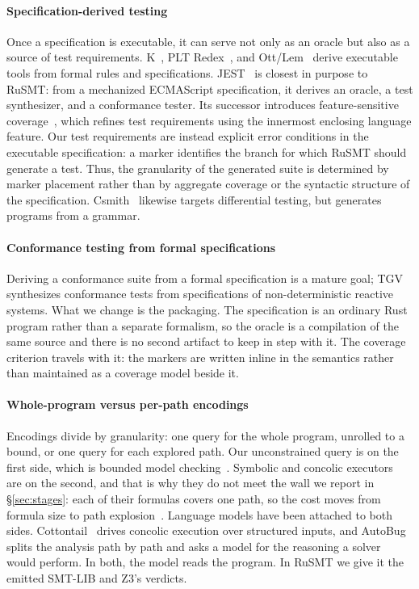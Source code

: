 \documentclass[sigconf,screen]{acmart}
\theoremstyle{definition}
\theoremstyle{remark}
\newcommand{\rusmt}{RuSMT}
\begin{document}
\paragraph{Specification-derived testing}
Once a specification is executable, it can serve not only as an oracle but also as a source of test requirements. K~\cite{rosu2010k}, PLT Redex~\cite{felleisen2009redex}, and Ott/Lem~\cite{sewell2007ott,mulligan2014lem} derive executable tools from formal rules and specifications. JEST~\cite{park2021jest} is closest in purpose to \rusmt{}: from a mechanized ECMAScript specification, it derives an oracle, a test synthesizer, and a conformance tester. Its successor introduces feature-sensitive coverage~\cite{park2023fscoverage}, which refines test requirements using the innermost enclosing language feature. Our test requirements are instead explicit error conditions in the executable specification: a marker identifies the branch for which \rusmt{} should generate a test. Thus, the granularity of the generated suite is determined by marker placement rather than by aggregate coverage or the syntactic structure of the specification. Csmith~\cite{yang2011csmith} likewise targets differential testing, but generates programs from a grammar.

\paragraph{Conformance testing from formal specifications}
Deriving a conformance suite from a formal specification is a mature goal; TGV~\cite{jard2005tgv} synthesizes conformance tests
from specifications of non-deterministic reactive systems. What we change is the
packaging. The specification is an ordinary Rust program rather than a separate
formalism, so the oracle is a compilation of the same source and there is no
second artifact to keep in step with it. The coverage criterion travels with it:
the markers are written inline in the semantics rather than maintained as a
coverage model beside it.

\paragraph{Whole-program versus per-path encodings}
Encodings divide by granularity: one query for the whole program, unrolled to a
bound, or one query for each explored path. Our unconstrained query is on the
first side, which is bounded model checking~\cite{clarke2004cbmc}. Symbolic and
concolic executors~\cite{cadar2008klee,poeplau2020symcc} are on the second, and
that is why they do not meet the wall we report in \S\ref{sec:stages}: each of
their formulas covers one path, so the cost moves from formula size to path
explosion~\cite{cadar2008klee}. Language models have been attached to both
sides. Cottontail~\cite{tu2025cottontail} drives concolic execution over
structured inputs, and AutoBug~\cite{meng2025autobug} splits the analysis path
by path and asks a model for the reasoning a solver would perform. In both, the model reads the program. In \rusmt{} we give it the emitted
SMT-LIB and Z3's verdicts.
\end{document}
